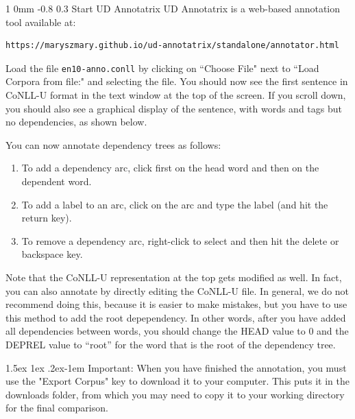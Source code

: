 \documentclass[10.9pt]{article}
\makeatletter
\newcommand{\newsec}[2]{\section{#1}\label{sec:#2}\noindent}
\renewcommand{\section}{\@startsection
{section}%
{1}%
{0mm}%
{-0.8\baselineskip}%
{0.3\baselineskip}%
{\bfseries\large}}%
\renewcommand{\paragraph}{%
  \@startsection{paragraph}{4}%
  {\z@}{1.5ex \@plus 1ex \@minus .2ex}{-1em}%
  {\normalfont\normalsize\bfseries}%
}\makeatother
\makeatother
\begin{document}
\newsec{Start UD Annotatrix}{brat}%
UD Annotatrix is a web-based annotation tool available at: 
\begin{verbatim}
https://maryszmary.github.io/ud-annotatrix/standalone/annotator.html
\end{verbatim}
Load the file {\tt en10-anno.conll} by clicking on ``Choose File" next to ``Load Corpora from file:" and selecting the file. 
You should now see the first sentence in CoNLL-U format in the text window at the top of the screen. 
If you scroll down, you should also see a graphical display of the sentence, with words and tags but no dependencies, as shown below.
\begin{center}
\end{center}
You can now annotate dependency trees as follows:
\begin{enumerate}[topsep=5pt,noitemsep]
\item To add a dependency arc, click first on the head word and then on the dependent word.
\item To add a label to an arc, click on the arc and type the label (and hit the return key).
\item To remove a dependency arc, right-click to select and then hit the delete or backspace key.
\end{enumerate}
Note that the CoNLL-U representation at the top gets modified as well. In fact, you can also annotate by directly editing the CoNLL-U file. In general, we do not recommend doing this, because it is easier to make mistakes, but you have to use this method to add the root depependency. In other words, after you have added all dependencies between words, you should change the HEAD value to 0 and the DEPREL value to ``root'' for the word that is the root of the dependency tree. 

\paragraph{Important:} When you have finished the annotation, you must use the "Export Corpus" key to download it to your computer. This puts it in the downloads folder, from which you may need to copy it to your working directory for the final comparison. 
\end{document}

